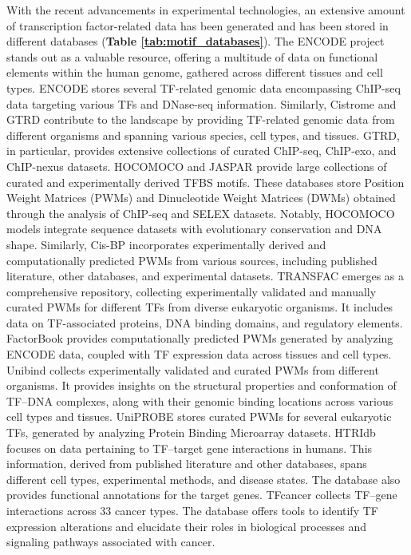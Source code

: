 \documentclass[a4paper, titlepage, openright]{book}
\begin{document}
With the recent advancements in experimental technologies, an extensive amount of transcription factor-related data has been generated and has been stored in different databases (\textbf{Table \ref{tab:motif_databases}}). The ENCODE project \citep{encode2012integrated} stands out as a valuable resource, offering a multitude of data on functional elements within the human genome, gathered across different tissues and cell types. ENCODE stores several TF-related genomic data encompassing ChIP-seq data targeting various TFs and DNase-seq information. Similarly, Cistrome \citep{zheng2019cistrome} and GTRD \citep{kolmykov2021gtrd} contribute to the landscape by providing TF-related genomic data from different organisms and spanning various species, cell types, and tissues. GTRD, in particular, provides extensive collections of curated ChIP-seq, ChIP-exo, and ChIP-nexus datasets. HOCOMOCO \citep{kulakovskiy2013hocomoco,kulakovskiy2018hocomoco} and JASPAR \citep{sandelin2004jaspar,fornes2020jaspar} provide large collections of curated and experimentally derived TFBS motifs. These databases store Position Weight Matrices (PWMs) and Dinucleotide Weight Matrices (DWMs) obtained through the analysis of ChIP-seq and SELEX datasets. Notably, HOCOMOCO models integrate sequence datasets with evolutionary conservation and DNA shape. Similarly, Cis-BP \citep{weirauch2014determination} incorporates experimentally derived and computationally predicted PWMs from various sources, including published literature, other databases, and experimental datasets. TRANSFAC \citep{wingender1996transfac,wingender2000transfac} emerges as a comprehensive repository, collecting experimentally validated and manually curated PWMs for different TFs from diverse eukaryotic organisms. It includes data on TF-associated proteins, DNA binding domains, and regulatory elements. FactorBook \citep{pratt2022factorbook} provides computationally predicted PWMs generated by analyzing ENCODE data, coupled with TF expression data across tissues and cell types. Unibind \citep{puig2015human} collects experimentally validated and curated PWMs from different organisms. It provides insights on the structural properties and conformation of TF–DNA complexes, along with their genomic binding locations across various cell types and tissues. UniPROBE \citep{newburger2009uniprobe} stores curated PWMs for several eukaryotic TFs, generated by analyzing Protein Binding Microarray datasets. HTRIdb \citep{bovolenta2012htridb} focuses on data pertaining to TF–target gene interactions in humans. This information, derived from published literature and other databases, spans different cell types, experimental methods, and disease states. The database also provides functional annotations for the target genes. TFcancer \citep{huang2021tfcancer} collects TF–gene interactions across 33 cancer types. The database offers tools to identify TF expression alterations and elucidate their roles in biological processes and signaling pathways associated with cancer.
\end{document}
